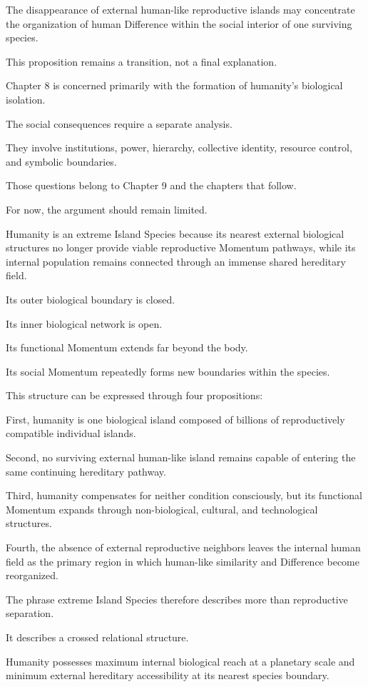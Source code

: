 The disappearance of external human-like reproductive islands may concentrate the organization of human Difference within the social interior of one surviving species.

This proposition remains a transition, not a final explanation.

Chapter 8 is concerned primarily with the formation of humanity’s biological isolation.

The social consequences require a separate analysis.

They involve institutions, power, hierarchy, collective identity, resource control, and symbolic boundaries.

Those questions belong to Chapter 9 and the chapters that follow.

For now, the argument should remain limited.

Humanity is an extreme Island Species because its nearest external biological structures no longer provide viable reproductive Momentum pathways, while its internal population remains connected through an immense shared hereditary field.

Its outer biological boundary is closed.

Its inner biological network is open.

Its functional Momentum extends far beyond the body.

Its social Momentum repeatedly forms new boundaries within the species.

This structure can be expressed through four propositions:

First, humanity is one biological island composed of billions of reproductively compatible individual islands.

Second, no surviving external human-like island remains capable of entering the same continuing hereditary pathway.

Third, humanity compensates for neither condition consciously, but its functional Momentum expands through non-biological, cultural, and technological structures.

Fourth, the absence of external reproductive neighbors leaves the internal human field as the primary region in which human-like similarity and Difference become reorganized.

The phrase extreme Island Species therefore describes more than reproductive separation.

It describes a crossed relational structure.

Humanity possesses maximum internal biological reach at a planetary scale and minimum external hereditary accessibility at its nearest species boundary.

